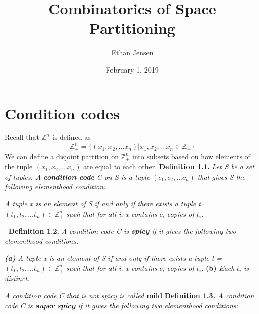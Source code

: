 \documentclass[12pt]{article}
\title{Combinatorics of Space Partitioning}
\author{Ethan Jensen}
\date{February 1, 2019}
\begin{document}
	\maketitle
\section{Condition codes}
\noindent
Recall that \(\mathbb{Z}_+^n\) is defined as
\[\mathbb{Z}_+^n=\{(x_1,x_2,...x_n)|x_1,x_2,...x_n\in\mathbb{Z}_+\}\]
We can define a disjoint partition on \(\mathbb{Z}_+^n\) into subsets based on how elements of the tuple \((x_1,x_2,...x_n)\) are equal to each other.
\newline \newline
\textbf{Definition 1.1.} \textit{Let S be a set of tuples. A \textbf{condition code} C on S is a tuple} \((c_1, c_2,...c_n)\) \textit{that gives S the following elementhood condition:} \newline
\begin{adjustwidth}{2.5em}{0pt}
	\textit{A tuple x is an element of S if and only if there exists a tuple t = \((t_1,t_2,...t_n) \in \mathbb{Z}_+^n\) such that for all i, x contains \(c_i\) copies of \(t_i\).}
\end{adjustwidth}
\(\ \)
\newline
\textbf{Definition 1.2.} \textit{A condition code C is \textbf{spicy} if it gives the following two elementhood conditions:}
\begin{adjustwidth}{2.5em}{0pt}
	\textit{\textbf{(a)} A tuple x is an element of S if and only if there exists a tuple t = \((t_1,t_2,...t_n) \in \mathbb{Z}_+^n\) such that for all i, x contains \(c_i\) copies of \(t_i\).}
	\newline
	\newline
 \textbf{(b) } \textit{Each }\(t_i\)\textit{ is distinct.}
\end{adjustwidth}
\textit{A condition code C that is not spicy is called }\textbf{mild}
\newline
\newline
\textbf{Definition 1.3.} \textit{A condition code C is \textbf{super spicy} if it gives the following two elementhood conditions:}
\end{document}
